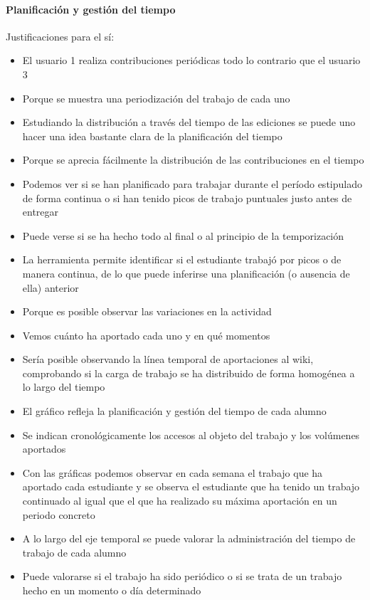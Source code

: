 \paragraph*{Planificación y gestión del tiempo}

Justificaciones para el sí:

\begin{itemize}
\item El usuario 1 realiza contribuciones periódicas todo lo contrario que el usuario 3
\item Porque se muestra una periodización del trabajo de cada uno
\item Estudiando la distribución a través del tiempo de las ediciones se puede uno hacer una idea bastante clara de la planificación del tiempo
\item Porque se aprecia fácilmente la distribución de las contribuciones en el tiempo
\item Podemos ver si se han planificado para trabajar durante el período estipulado de forma continua o si han tenido picos de trabajo puntuales justo antes de entregar
\item Puede verse si se ha hecho todo al final o al principio de la temporización
\item La herramienta permite identificar si el estudiante trabajó por picos o de manera continua, de lo que puede inferirse una planificación (o ausencia de ella) anterior
\item Porque es posible observar las variaciones en la actividad
\item Vemos cuánto ha aportado cada uno y en qué momentos
\item Sería posible observando la línea temporal de aportaciones al wiki, comprobando si la carga de trabajo se ha distribuido de forma homogénea a lo largo del tiempo
\item El gráfico refleja la planificación y gestión del tiempo de cada alumno
\item Se indican cronológicamente los accesos al objeto del trabajo y los volúmenes aportados
\item Con las gráficas podemos observar en cada semana el trabajo que ha aportado cada estudiante y se observa el estudiante que ha tenido un trabajo continuado al igual que el que ha realizado su máxima aportación en un periodo concreto
\item A lo largo del eje temporal se puede valorar la administración del tiempo de trabajo de cada alumno
\item Puede valorarse si el trabajo ha sido periódico o si se trata de un trabajo hecho en un momento o día determinado

\end{itemize}
